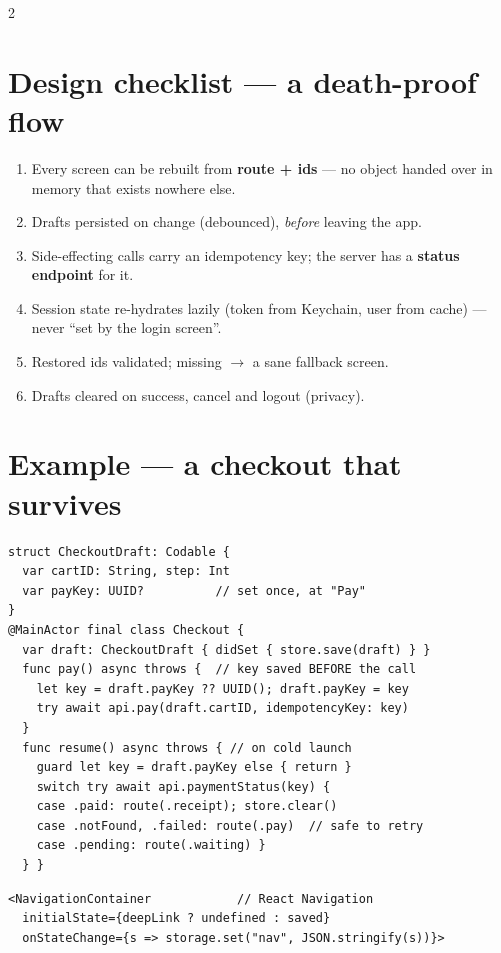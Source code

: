 \documentclass[8pt]{extarticle}
\begin{document}
\begin{multicols}{2}
\section{Design checklist — a death-proof flow}
\begin{enumerate}
  \item Every screen can be rebuilt from \textbf{route + ids} — no object handed
        over in memory that exists nowhere else.
  \item Drafts persisted on change (debounced), \emph{before} leaving the app.
  \item Side-effecting calls carry an idempotency key; the server has a
        \textbf{status endpoint} for it.
  \item Session state re-hydrates lazily (token from Keychain, user from cache)
        — never ``set by the login screen''.
  \item Restored ids validated; missing $\to$ a sane fallback screen.
  \item Drafts cleared on success, cancel and logout (privacy).
\end{enumerate}

\columnbreak

\section{Example — a checkout that survives}
\begin{lstlisting}[language=SwiftSheet]
struct CheckoutDraft: Codable {
  var cartID: String, step: Int
  var payKey: UUID?          // set once, at "Pay"
}
@MainActor final class Checkout {
  var draft: CheckoutDraft { didSet { store.save(draft) } }
  func pay() async throws {  // key saved BEFORE the call
    let key = draft.payKey ?? UUID(); draft.payKey = key
    try await api.pay(draft.cartID, idempotencyKey: key)
  }
  func resume() async throws { // on cold launch
    guard let key = draft.payKey else { return }
    switch try await api.paymentStatus(key) {
    case .paid: route(.receipt); store.clear()
    case .notFound, .failed: route(.pay)  // safe to retry
    case .pending: route(.waiting) }
  } }
\end{lstlisting}
\begin{lstlisting}[language=TSSheet]
<NavigationContainer            // React Navigation
  initialState={deepLink ? undefined : saved}
  onStateChange={s => storage.set("nav", JSON.stringify(s))}>
\end{lstlisting}


\end{multicols}
\end{document}
